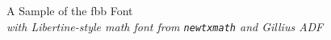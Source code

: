\documentclass[11pt]{article}
\begin{document}
{\LARGE \noindent A Sample of the fbb Font}\\

{\large \noindent \textit{with Libertine-style math font from \texttt{newtxmath} and Gillius ADF}}\\[5pt]


\end{document}
